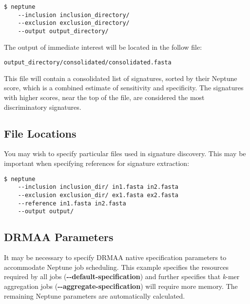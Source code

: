 \documentclass[a4paper,10pt]{article}
\begin{document}
\begin{minipage}{\linewidth}
\begin{lstlisting}[frame=single, style=bash]
$ neptune
    --inclusion inclusion_directory/
    --exclusion exclusion_directory/
    --output output_directory/ 
\end{lstlisting}
\end{minipage}

The output of immediate interest will be located in the follow file:

\begin{minipage}{\linewidth}
\begin{lstlisting}[frame=single, style=bash]
output_directory/consolidated/consolidated.fasta
\end{lstlisting}
\end{minipage}

This file will contain a consolidated list of signatures, sorted by their Neptune score, which is a combined estimate of sensitivity and specificity. The signatures with higher scores, near the top of the file, are considered the most discriminatory signatures.

\subsection{File Locations}

You may wish to specify particular files used in signature discovery. This may be important when specifying references for signature extraction:

\begin{minipage}{\linewidth}
\begin{lstlisting}[frame=single, style=bash]
$ neptune
    --inclusion inclusion_dir/ in1.fasta in2.fasta
    --exclusion exclusion_dir/ ex1.fasta ex2.fasta
    --reference in1.fasta in2.fasta    
    --output output/
\end{lstlisting}
\end{minipage}

\subsection{DRMAA Parameters}

It may be necessary to specify DRMAA native specification parameters to accommodate Neptune job scheduling. This example specifies the resources required by all jobs (\mbox{\textbf{-{}-default-specification}}) and further specifies that \textit{k}-mer aggregation jobs (\mbox{\textbf{-{}-aggregate-specification}}) will require more memory. The remaining Neptune parameters are automatically calculated.
\end{document}
